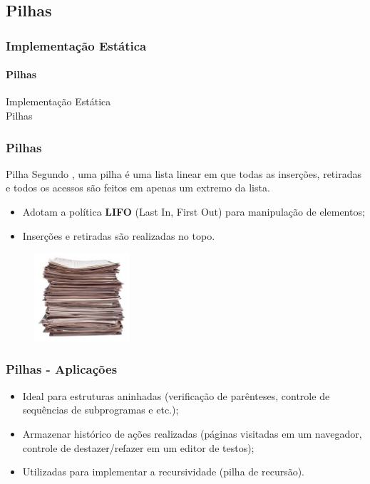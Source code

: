 \documentclass[aspectratio=169]{beamer}
\begin{document}
\subsection{Pilhas}

\begin{frame}
\frametitle{Implementação Estática}
\framesubtitle{Pilhas}
\centering
\huge{Implementação Estática\\
Pilhas
}
\end{frame}


\begin{frame}
\frametitle{Pilhas}
\begin{block} {Pilha}
 Segundo , uma pilha é uma lista linear em que todas as inserções, retiradas e todos os acessos são feitos em apenas um extremo da lista.
\end{block}

\begin{itemize}
 \item Adotam a política {\bf LIFO} (Last In, First Out) para manipulação de elementos; 
 \item Inserções e retiradas são realizadas no topo.
 \end{itemize}
\begin{figure}[!h]
  \centering
  \includegraphics[width=100pt]{imgs/pilha.jpg}
  \label{fig_pilha}
\end{figure}
\end{frame}


\begin{frame}
\frametitle{Pilhas - Aplicações}
\begin{itemize}
 \item Ideal para estruturas aninhadas (verificação de parênteses, controle de sequências de subprogramas e etc.);
 \item Armazenar histórico de ações realizadas (páginas visitadas em um navegador, controle de destazer/refazer em um editor de testos);
 \item Utilizadas para implementar a recursividade (pilha de recursão).
\end{itemize}
\end{frame}
\end{document}
